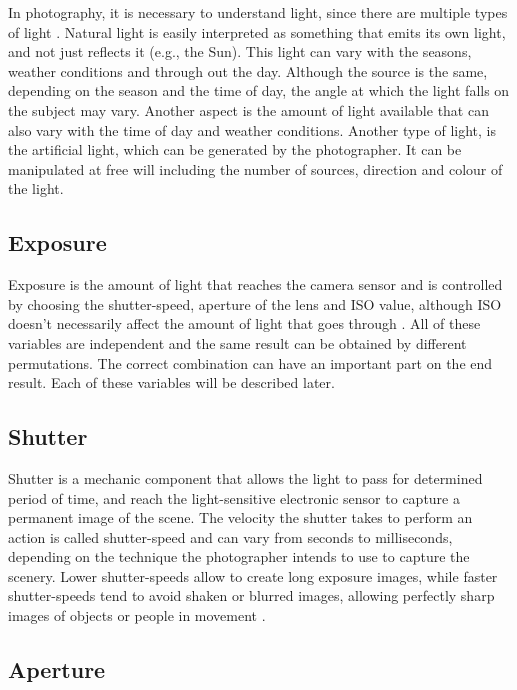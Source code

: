 In photography, it is necessary to understand light, since there are multiple types of light \cite{Santos}. Natural light is easily interpreted as something that emits its own light, and not just reflects it (e.g., the Sun). This light can vary with the seasons, weather conditions and through out the day. Although the source is the same, depending on the season and the time of day, the angle at which the light falls on the subject may vary. Another aspect is the amount of light available that can also vary with the time of day and weather conditions.
Another type of light, is the artificial light, which can be generated by the photographer. It can be manipulated at free will including the number of sources, direction and colour of the light.


\subsection{Exposure}
\label{sub:exposure}

Exposure is the amount of light that reaches the camera sensor and is controlled by choosing the shutter-speed, aperture of the lens and ISO value, although ISO doesn't necessarily affect the amount of light that goes through \cite{kamps2012rules, Santos}. All of these variables are independent and the same result can be obtained by different permutations. The correct combination can have an important part on the end result. Each of these variables will be described later.

\subsection{Shutter}
\label{sub:shutter}

Shutter is a mechanic component that allows the light to pass for determined period of time, and reach the light-sensitive electronic sensor to capture a permanent image of the scene. The velocity the shutter takes to perform an action is called shutter-speed and can vary from seconds to milliseconds, depending on the technique the photographer intends to use to capture the scenery. Lower shutter-speeds allow to create long exposure images, while faster shutter-speeds tend to avoid shaken or blurred images, allowing perfectly sharp images of objects or people in movement \cite{Santos}.

\subsection{Aperture}
\label{sub:aperture}

